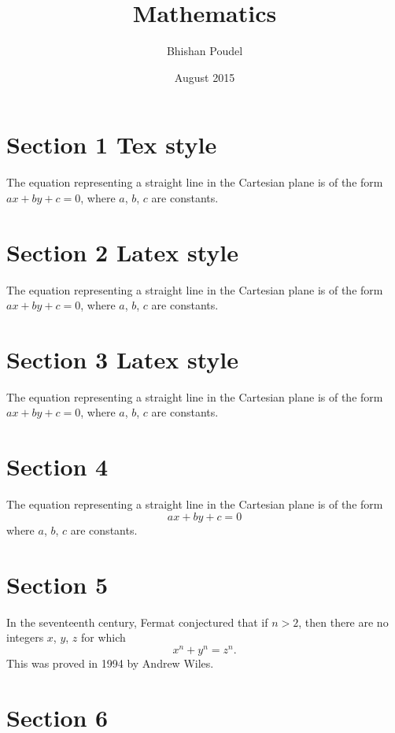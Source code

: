 \documentclass{article}
\title{Mathematics}
\author{Bhishan Poudel}
\date{August 2015}
\begin{document}
\maketitle

\section{ Section   1 Tex style }
The equation representing
a straight line in the Cartesian plane
is of the form $ax+by+c=0$, where $a$, $b$, $c$ are constants.

\section{ Section   2 Latex style}
The equation representing a straight line in the Cartesian plane is of
the form \(ax+by+c=0\), where \(a\), \(b\), \(c\) are constants.

\section{ Section   3 Latex style}
The equation representing a straight line in the Cartesian plane is
of the form \begin{math}ax+by+c=0\end{math}, where \begin{math} a
\end{math}, \begin{math} b \end{math}, \begin{math} c \end{math} are
constants.

\section{ Section   4}
The equation representing a straight line in the Cartesian plane is
of the form
$$
ax+by+c=0
$$
where $a$, $b$, $c$ are constants.

\section{ Section   5}
In the seventeenth century, Fermat conjectured that if $n>2$, then
there are no integers $x$, $y$, $z$ for which
$$
x^n+y^n=z^n.
$$
This was proved in 1994 by Andrew Wiles.

\section{ Section   6}
\end{document}
